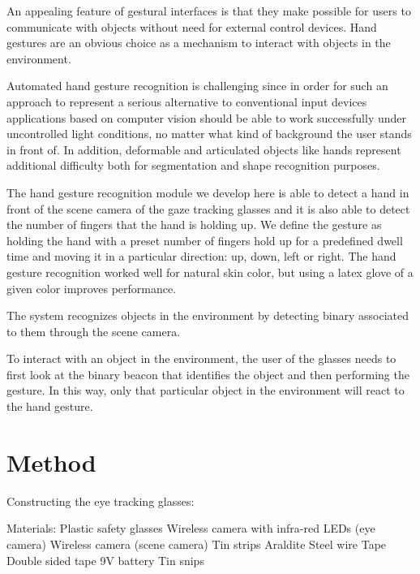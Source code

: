 \documentclass[jou,a4paper,notxfonts]{apa}
\begin{document}
An appealing feature of gestural interfaces is that they make possible for users to communicate with objects
without need for external control devices. Hand gestures are an obvious choice as a mechanism to interact with objects
in the environment. 

Automated hand gesture recognition is challenging since in order for such an approach to represent a serious alternative
to conventional input devices applications based on computer vision should be able to work successfully under
uncontrolled light conditions, no matter what kind of background the user stands in front of. In addition, deformable
and articulated objects like hands represent additional difficulty both for segmentation and shape recognition
purposes.

The hand gesture recognition module we develop here is able to detect a hand in front of the scene camera of the gaze
tracking glasses and it is also able to detect the number of fingers that the hand is holding up. We define the gesture
as holding the hand with a preset number of fingers hold up  for a predefined dwell time and moving it in a particular
direction: up, down, left  or right. The hand gesture recognition worked well for natural skin color, but using a latex glove of a
given color improves performance.

The system recognizes objects in the environment by detecting binary associated to them through the scene camera.

To interact with an object in the environment, the user of the glasses needs to first look at the binary beacon that
identifies the object and then performing the gesture. In this way, only that particular object in the environment 
will react to the hand gesture.


\section{Method}

Constructing the eye tracking glasses:

Materials:
Plastic safety glasses
Wireless camera with infra-red LEDs (eye camera)
Wireless camera	(scene camera)
Tin strips
Araldite
Steel wire
Tape
Double sided tape
9V battery
Tin snips
\end{document}
